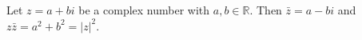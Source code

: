 Let $z = a + bi$ be a complex number with $a, b \in \mathbb{R}$.
Then $\bar{z} = a - bi$ and $z \bar{z} = a^{2} + b^{2} = \lvert z \rvert^{2}$.